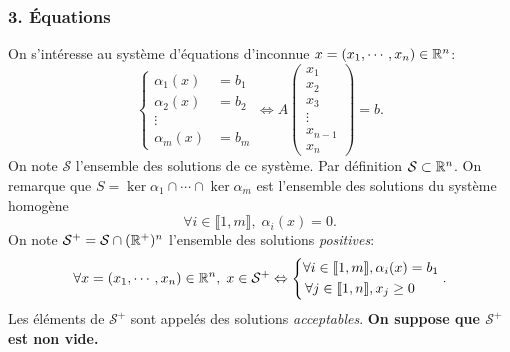 \subsubsection*{3. \'Equations}\noindent
On s'intéresse au système d'équations d'inconnue $x = (x_1, \cdots, x_n)\in \mathbb{R}^n$:
\[
  \left\lbrace
  \begin{aligned}
    \alpha_1(x) &= b_1\\
    \alpha_2(x) &= b_2\\
    \vdots \\
    \alpha_m(x) &= b_m
  \end{aligned}
  \right.
\Leftrightarrow 
A 
\begin{pmatrix}
  x_1 \\x_2 \\ x_3 \\ \vdots \\ x_{n-1} \\x_n
\end{pmatrix}
= b.
\]
On note $\mathcal{S}$ l'ensemble des solutions de ce système. Par définition $\mathcal{S} \subset \mathbb{R}^n$.\newline 
On remarque que $S = \ker \alpha_1 \cap \cdots \cap \ker \alpha_m$ est l'ensemble des solutions du système homogène
\[
  \forall i \in \llbracket 1,m \rrbracket, \; \alpha_i(x) = 0.
\]
On note $\mathcal{S}^+ = \mathcal{S} \cap (\mathbb{R}^+)^n$ l'ensemble des solutions \emph{positives}:
\[
  \forall x = (x_1, \cdots, x_n) \in \mathbb{R}^n,\;
  x \in \mathcal{S}^+ \Leftrightarrow
  \left\lbrace
  \begin{aligned}
    \forall i \in \llbracket 1, m\rrbracket &, \alpha_i(x) = b_1\\
    \forall j \in \llbracket 1,n \rrbracket &, x_j \geq 0
  \end{aligned}
  \right. .
\]
Les éléments de $\mathcal{S}^+$ sont appelés des solutions \emph{acceptables}.\newline
\textbf{On suppose que $\mathcal{S}^+ $ est non vide.}

